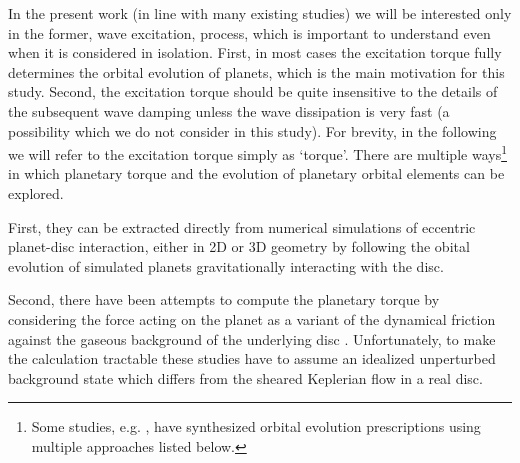 In the present work (in line with many existing studies) we will be interested only in the former, wave excitation, process, which is important to understand even when it is considered in isolation. First, in most cases the excitation torque fully determines the orbital evolution of planets, which is the main motivation for this study. Second, the excitation torque should be quite insensitive to the details of the subsequent wave damping unless the wave dissipation is very fast (a possibility which we do not consider in this study). For brevity, in the following we will refer to the excitation torque simply as `torque'. There are multiple ways\footnote{Some studies, e.g. \citet{IdaEtAl_2020}, have synthesized orbital evolution prescriptions using multiple approaches listed below.} in which planetary torque and the evolution of planetary orbital elements can be explored. 

First, they can be extracted directly from numerical simulations of eccentric planet-disc interaction, either in 2D or 3D geometry \citep{CresswellNelson_2006,CresswellNelson_2008,Cresswell2007} by following the obital evolution of simulated planets gravitationally interacting with the disc. 

Second, there have been attempts to compute the planetary torque by considering the force acting on the planet as a variant of the dynamical friction against the gaseous background of the underlying disc \citep{MutoEtAl_2011,Desj2022,BuehlerEtAl_2024,ONeill2024}. Unfortunately, to make the calculation tractable these studies have to assume an idealized unperturbed background state which differs from the sheared Keplerian flow in a real disc. 

